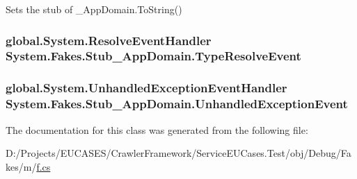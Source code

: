 Sets the stub of \-\_\-\-App\-Domain.\-To\-String()

\hypertarget{class_system_1_1_fakes_1_1_stub___app_domain_a839441369c178f5cdf4b381557e0d51d}{
\subsubsection[{Type\-Resolve\-Event}]{\setlength{\rightskip}{0pt plus 5cm}global.\-System.\-Resolve\-Event\-Handler System.\-Fakes.\-Stub\-\_\-\-App\-Domain.\-Type\-Resolve\-Event}}\label{class_system_1_1_fakes_1_1_stub___app_domain_a839441369c178f5cdf4b381557e0d51d}
\hypertarget{class_system_1_1_fakes_1_1_stub___app_domain_a535c305af1bd6271748a45fe715e72cb}{
\subsubsection[{Unhandled\-Exception\-Event}]{\setlength{\rightskip}{0pt plus 5cm}global.\-System.\-Unhandled\-Exception\-Event\-Handler System.\-Fakes.\-Stub\-\_\-\-App\-Domain.\-Unhandled\-Exception\-Event}}\label{class_system_1_1_fakes_1_1_stub___app_domain_a535c305af1bd6271748a45fe715e72cb}


The documentation for this class was generated from the following file\-:\begin{DoxyCompactItemize}
\item 
D\-:/\-Projects/\-E\-U\-C\-A\-S\-E\-S/\-Crawler\-Framework/\-Service\-E\-U\-Cases.\-Test/obj/\-Debug/\-Fakes/m/\hyperlink{m_2f_8cs}{f.\-cs}\end{DoxyCompactItemize}
